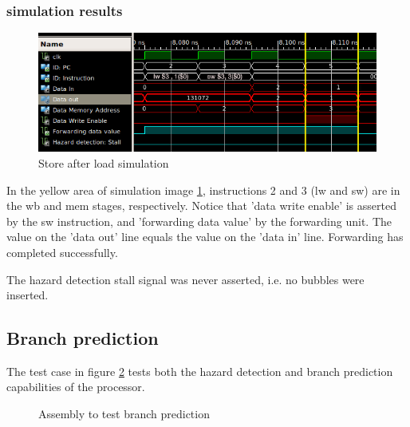\subsubsection*{simulation results}

\begin{figure}[H]
  \begin{center}
    \includegraphics[width=\textwidth]{assets/lw-sw-forwarding.png}
  \end{center}
  \caption{
    Store after load simulation}
  \label{fig:simulate_lw_sw}
\end{figure}

In the yellow area of simulation image \ref{fig:simulate_lw_sw}, instructions 2 and 3 (lw and sw) are in the wb and mem stages, respectively.
Notice that 'data write enable' is asserted by the sw instruction, and 'forwarding data value' by the forwarding unit.
The value on the 'data out' line equals the value on the 'data in' line. Forwarding has completed successfully.

The hazard detection stall signal was never asserted, i.e. no bubbles were inserted.

\subsection{Branch prediction}

The test case in figure \ref{fig:test-branch-prediction} tests both the hazard detection and branch prediction capabilities of the processor.

\begin{figure}[H]
  \caption{Assembly to test branch prediction} \label{fig:test-branch-prediction}
\end{figure}

